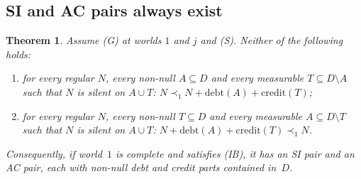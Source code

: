 \documentclass[11pt]{article}
\newtheorem{theorem}{Theorem}
\theoremstyle{definition}\newtheorem{definition}[theorem]{Definition}
\theoremstyle{remark}\newtheorem{remark}[theorem]{Remark}
\newcommand{\debt}{\mathrm{debt}}
\newcommand{\cred}{\mathrm{credit}}
\begin{document}
\subsection{SI and AC pairs always exist}

\begin{theorem}\label{thm:SIAC}
Assume (G) at worlds $1$ and $j$ and (S). Neither of the following holds:
\begin{enumerate}[leftmargin=*]
\item[(DF)] for every regular $N$, every non-null $A\subseteq D$ and every
measurable $T\subseteq D\setminus A$ such that $N$ is silent on $A\cup T$:
$N\prec_1N+\debt(A)+\cred(T)$;
\item[(CF)] for every regular $N$, every non-null $T\subseteq D$ and every
measurable $A\subseteq D\setminus T$ such that $N$ is silent on $A\cup T$:
$N+\debt(A)+\cred(T)\prec_1N$.
\end{enumerate}
Consequently, if world~$1$ is complete and satisfies (IB), it has an SI pair and an AC pair, each with non-null debt and credit parts contained
in~$D$.
\end{theorem}
\end{document}
